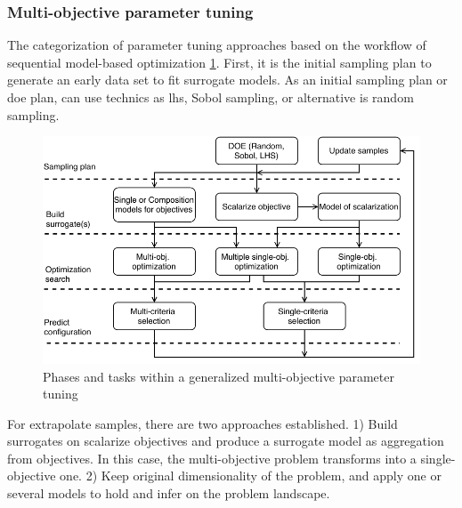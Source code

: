         
        \subsubsection{Multi-objective parameter tuning}

            The categorization of parameter tuning approaches based on the workflow of sequential model-based optimization \ref{fig:mo_param_tuning}. First, it is the initial sampling plan to generate an early data set to fit surrogate models. As an initial sampling plan or \gls{doe} plan, can use technics as \gls{lhs}, Sobol sampling, or alternative is random sampling.
            
            \begin{figure} 
                \centering
                \includegraphics[width=\textwidth]{content/images/tax_mb_tuning}
                \caption[Phases and tasks within a generalized multi-objective parameter tuning]{Phases and tasks within a generalized multi-objective parameter tuning}
                \label{fig:mo_param_tuning}
            \end{figure}

            For extrapolate samples, there are two approaches established. 1) Build surrogates on scalarize objectives and produce a surrogate model as aggregation from objectives. In this case, the multi-objective problem transforms into a single-objective one. 2) Keep original dimensionality of the problem, and apply one or several models to hold and infer on the problem landscape.

